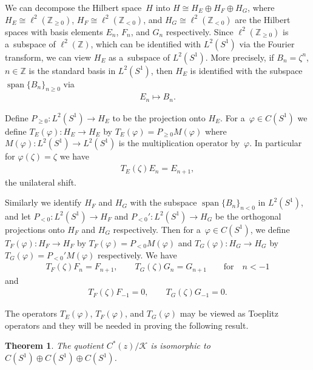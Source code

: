 \documentclass[11pt]{article}
\numberwithin{equation}{section}
\newtheorem{Theorem}{Theorem}[section]
\begin{document}
We can decompose the Hilbert space~$H$ into $H \cong H_E \oplus H_F \oplus H_G$, where $H_E\cong\ell^2({\mathbb
Z}_{\ge0})$, $H_F\cong\ell^2({\mathbb Z}_{<0})$, and $H_G\cong\ell^2({\mathbb Z}_{<0})$ are the Hilbert spaces with
basis elements $E_n$, $F_n$, and $G_n$ respectively.
Since $\ell^2({\mathbb Z}_{\ge0})$ is a~subspace of $\ell^2({\mathbb Z})$, which can be identif\/ied with $L^2(S^1)$ via
the Fourier transform, we can view $H_E$ as a~subspace of $L^2(S^1)$.
More precisely, if $B_n=\zeta^n$, $n\in{\mathbb Z}$ is the standard basis in $L^2(S^1)$, then $H_E$ is identif\/ied with
the subspace $\operatorname{span}\{B_n\}_{n\geq 0}$ via
\begin{gather*}
E_n\mapsto B_n.
\end{gather*}

Def\/ine $P_{\ge0}: L^2(S^1)\to H_E$ to be the projection onto $H_E$.
For a~$\varphi\in C(S^1)$ we def\/ine $T_E(\varphi):H_E \to H_E$ by $T_E(\varphi)=P_{\ge0}M(\varphi)$ where
$M(\varphi):L^2(S^1)\to L^2(S^1)$ is the multiplication operator by~$\varphi$.
In particular for $\varphi(\zeta)=\zeta$ we have{\samepage
\begin{gather}
\label{teone}
T_E(\zeta)E_n=E_{n+1},
\end{gather}
the unilateral shift.}

Similarly we identify $H_F$ and $H_G$ with the subspace $\operatorname{span}\{B_n\}_{n< 0}$ in $L^2(S^1)$, and let $P_{<0}:L^2(S^1)\to
H_F$ and $P_{<0}':L^2(S^1)\to H_G$ be the orthogonal projections onto $H_F$ and $H_G$ respectively.
Then for a~$\varphi\in C(S^1)$, we def\/ine $T_F(\varphi):H_F \to H_F$ by $T_F(\varphi)=P_{<0}M(\varphi)$ and
$T_G(\varphi):H_G\to H_G$ by $T_G(\varphi)=P_{<0}'M(\varphi)$ respectively.
We have
\begin{gather}
\label{tfonf}
T_F(\zeta)F_n=F_{n+1},
\qquad
T_G(\zeta)G_n=G_{n+1}
\qquad
\text{for}
\quad
n<-1
\end{gather}
and
\begin{gather}
\label{tgong}
T_F(\zeta)F_{-1}=0,
\qquad
T_G(\zeta)G_{-1}=0.
\end{gather}

The operators $T_E(\varphi)$, $T_F(\varphi)$, and $T_G(\varphi)$ may be viewed as Toeplitz operators and they will be
needed in proving the following result.

\begin{Theorem}
\label{quotient_algebra}
The quotient $C^*(z)/\mathcal{K}$ is isomorphic to $C(S^1)\oplus C(S^1)\oplus C(S^1)$.
\end{Theorem}
\end{document}
